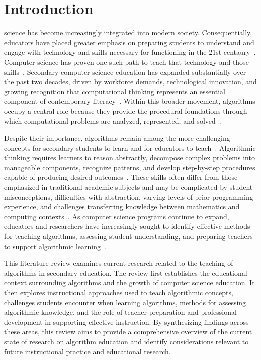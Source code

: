 % 

\section{Introduction}
 science has become increasingly integrated into modern society.
Consequentially, educators have placed greater emphasis on preparing students to understand and engage with technology and skills necessary for functioning in the 21st centaury~\cite{brandt2025assessing}.
Computer science has proven one such path to teach that technology and those skills~\cite{yadav2016computational,grover2021teaching,bell2014presenting}.
Secondary computer science education has expanded substantially over the past two decades, driven by workforce demands, technological innovation, and
  growing recognition that computational thinking represents an essential component of contemporary literacy~\cite{yadav2016computational,grover2017assessing}.
Within this broader movement, algorithms occupy a central role because they provide the procedural foundations through which computational problems
  are analyzed, represented, and solved~\cite{futschek2006algorithmic,Voog2012}.

Despite their importance, algorithms remain among the more challenging concepts for secondary students to learn and for educators to teach~\cite{gal2004efficiency,gal2002concept}.
Algorithmic thinking requires learners to reason abstractly, decompose complex problems into manageable components, recognize patterns, and develop
  step-by-step procedures capable of producing desired outcomes~\cite{futschek2006algorithmic,yadav2016computational}.
These skills often differ from those emphasized in traditional academic subjects and may be complicated by student misconceptions, difficulties with
  abstraction, varying levels of prior programming experience, and challenges transferring knowledge between mathematics and computing contexts~\cite{gal2004efficiency,avancena2015usability}.
As computer science programs continue to expand, educators and researchers have increasingly sought to identify effective methods for teaching
  algorithms, assessing student understanding, and preparing teachers to support algorithmic learning~\cite{zhou2020high,Voog2012,grover2021teaching}.

This literature review examines current research related to the teaching of algorithms in secondary education.
The review first establishes the educational context surrounding algorithms and the growth of computer science education.
It then explores instructional approaches used to teach algorithmic concepts, challenges students encounter when learning algorithms, methods for
  assessing algorithmic knowledge, and the role of teacher preparation and professional development in supporting effective instruction.
By synthesizing findings across these areas, this review aims to provide a comprehensive overview of the current state of research on algorithm
  education and identify considerations relevant to future instructional practice and educational research.

% 
